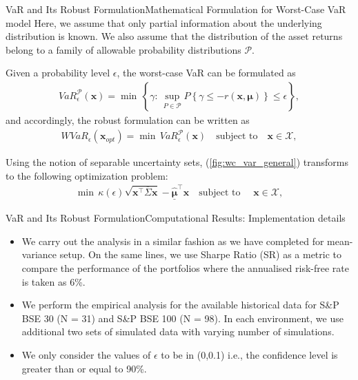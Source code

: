 \documentclass{beamer}
\begin{document}
\begin{frame}{VaR and Its Robust Formulation}{Mathematical Formulation for Worst-Case VaR model}
Here, we assume that only partial information about the
underlying distribution is known. We also assume that the distribution of the asset returns belong to a family of allowable probability distributions $\mathcal{P}.$

Given a probability level $\epsilon$, the worst-case VaR can be formulated as 
\begin{equation}
\begin{split}
VaR_{\epsilon}^{\mathcal{P}}(\mathbf{x}) = \min \, \left\{\gamma : \, \sup_{P \in \mathcal{P}} P\left\{\gamma \leq -r(\mathbf{x},\boldsymbol{\mu})\right\} \leq \epsilon \right\},
\end{split}
\label{fig:wc_var_basic}
\end{equation}
and accordingly, the robust formulation can be written as 
\begin{equation}
\begin{split}
WVaR_\epsilon(\mathbf{x}_{opt}) = \min \, VaR_{\epsilon}^{\mathcal{P}}(\mathbf{x}) \quad \text{subject to} \quad \mathbf{x} \in \mathcal{X}, 
\end{split}
\label{fig:wc_var_general}
\end{equation}

Using the notion of separable uncertainty sets, (\ref{fig:wc_var_general}) transforms to the following optimization problem:
\begin{equation}
\begin{split}
\min \, \kappa(\epsilon)\sqrt{\mathbf{x}^{\top}\overline{\Sigma}\mathbf{x}} - \underline{\hat{\boldsymbol{\mu}}}^{\top}\mathbf{x} \quad \text{subject to } \quad \mathbf{x} \in \mathcal{X},
\end{split}
\label{fig:var_poly}
\end{equation}
\end{frame}
\begin{frame}{VaR and Its Robust Formulation}{Computational Results: Implementation details}
\begin{itemize}
    \item We carry out the analysis in a similar fashion as we have completed for mean-variance setup. On the same lines, we use Sharpe Ratio (SR) as a metric to compare the performance of the portfolios where the  annualised risk-free rate is taken as 6\%.
    \item We perform the empirical analysis for the available historical data for S\&P BSE 30 (N = 31) and S\&P BSE 100 (N = 98). In each environment, we use additional two sets of simulated data with varying number of simulations.
    \item We only consider the values of $\epsilon$ to be in (0,0.1) i.e., the confidence level is greater than or equal to 90\%.
\end{itemize}
\end{frame}
\end{document}

